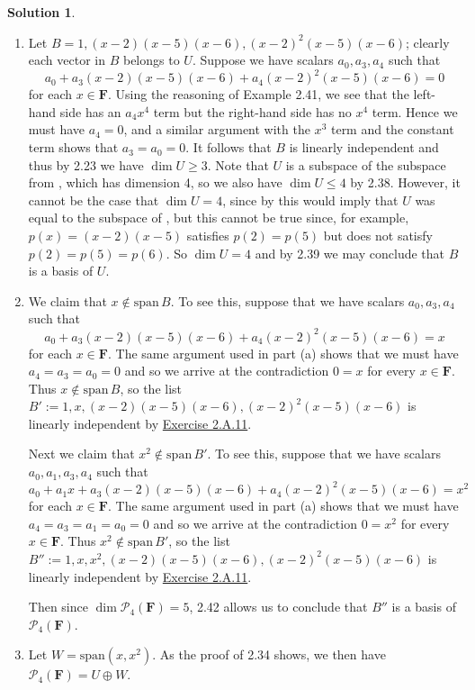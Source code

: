 \documentclass[12pt]{article}
\theoremstyle{definition}
\theoremstyle{exercise}
\theoremstyle{solution}
\newtheorem*{solution}{Solution}
\newcommand{\poly}{\mathcal{P}}
\newcommand{\Span}{\text{span}}
\newcommand{\F}{\mathbf{F}}
\begin{document}
\begin{solution}
    \begin{enumerate}
        \item Let \( B = 1, (x - 2)(x - 5)(x - 6), (x - 2)^2 (x - 5) (x - 6) \); clearly each vector in \( B \) belongs to \( U \). Suppose we have scalars \( a_0, a_3, a_4 \) such that
        \[
            a_0 + a_3 (x - 2)(x - 5)(x - 6) + a_4 (x - 2)^2 (x - 5) (x - 6) = 0
        \]
        for each \( x \in \F \). Using the reasoning of Example 2.41, we see that the left-hand side has an \( a_4 x^4 \) term but the right-hand side has no \( x^4 \) term. Hence we must have \( a_4 = 0 \), and a similar argument with the \( x^3 \) term and the constant term shows that \( a_3 = a_0 = 0 \). It follows that \( B \) is linearly independent and thus by 2.23 we have \( \dim U \geq 3 \). Note that \( U \) is a subspace of the subspace from , which has dimension 4, so we also have \( \dim U \leq 4 \) by 2.38. However, it cannot be the case that \( \dim U = 4 \), since by  this would imply that \( U \) was equal to the subspace of , but this cannot be true since, for example, \( p(x) = (x - 2)(x - 5) \) satisfies \( p(2) = p(5) \) but does not satisfy \( p(2) = p(5) = p(6) \). So \( \dim U = 4 \) and by 2.39 we may conclude that \( B \) is a basis of \( U \).

        \item We claim that \( x \not\in \Span\,B \). To see this, suppose that we have scalars \( a_0, a_3, a_4 \) such that
        \[
            a_0 + a_3 (x - 2)(x - 5)(x - 6) + a_4 (x - 2)^2 (x - 5) (x - 6) = x
        \]
        for each \( x \in \F \). The same argument used in part (a) shows that we must have \( a_4 = a_3 = a_0 = 0 \) and so we arrive at the contradiction \( 0 = x \) for every \( x \in \F \). Thus \( x \not\in \Span\,B \), so the list \( B' := 1, x, (x - 2)(x - 5)(x - 6), (x - 2)^2 (x - 5) (x - 6) \) is linearly independent by \href{https://lew98.github.io/Mathematics/LADR_Section_2_A_Exercises.pdf}{Exercise 2.A.11}.
        
        Next we claim that \( x^2 \not\in \Span\,B' \). To see this, suppose that we have scalars \( a_0, a_1, a_3, a_4 \) such that
        \[
            a_0 + a_1 x + a_3 (x - 2)(x - 5)(x - 6) + a_4 (x - 2)^2 (x - 5) (x - 6) = x^2
        \]
        for each \( x \in \F \). The same argument used in part (a) shows that we must have \( a_4 = a_3 = a_1 = a_0 = 0 \) and so we arrive at the contradiction \( 0 = x^2 \) for every \( x \in \F \). Thus \( x^2 \not\in \Span\,B' \), so the list \( B'' := 1, x, x^2, (x - 2)(x - 5)(x - 6), (x - 2)^2 (x - 5) (x - 6) \) is linearly independent by \href{https://lew98.github.io/Mathematics/LADR_Section_2_A_Exercises.pdf}{Exercise 2.A.11}.

        Then since \( \dim \poly_4(\F) = 5 \), 2.42 allows us to conclude that \( B'' \) is a basis of \( \poly_4(\F) \).

        \item Let \( W = \Span(x, x^2) \). As the proof of 2.34 shows, we then have \( \poly_4(\F) = U \oplus W \).
    \end{enumerate}
\end{solution}
\end{document}
